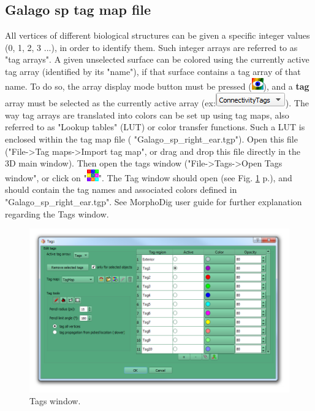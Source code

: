 \documentclass[12pt, a4paper]{book}
\begin{document}
\subsection{Galago sp tag map file}

All vertices of different biological structures can be given a specific integer values (0, 1, 2, 3 ...), in order to identify them. Such integer arrays are referred to as "tag arrays". A given unselected surface can be colored using the currently active tag array (identified by its "name"), if that surface contains a tag array of that name. To do so, the array display mode button must be pressed (\includegraphics[scale=0.7]{../images/04/show_color_scale.png}), and a \textbf{tag} array must be selected as the currently active array (ex:\includegraphics[scale=0.5]{../images/04/scalarcombo_tag.png}). The way tag arrays are translated into colors can be set up using tag maps, also referred to as "Lookup tables" (LUT) or color transfer functions. Such a LUT is enclosed within the tag map file ( "Galago\_sp\_right\_ear.tgp"). Open this file ("File->Tag maps->Import tag map", or drag and drop this file directly in the 3D main window). Then open the tags window ("File->Tags->Open Tags window", or click on "\includegraphics[scale=0.7]{../images/04/tag_edit.png}". The Tag window should open (see Fig. \ref{tags_window} p.\pageref{tags_window}), and should contain the tag names and associated colors defined in "Galago\_sp\_right\_ear.tgp". See MorphoDig user guide for further explanation regarding the Tags window.\\

\begin{figure}
  \centering
  \includegraphics[scale=0.5]{../images/12/tags_window.png}
\caption{Tags window.}	
\label{tags_window}
 \end{figure}
\end{document}
